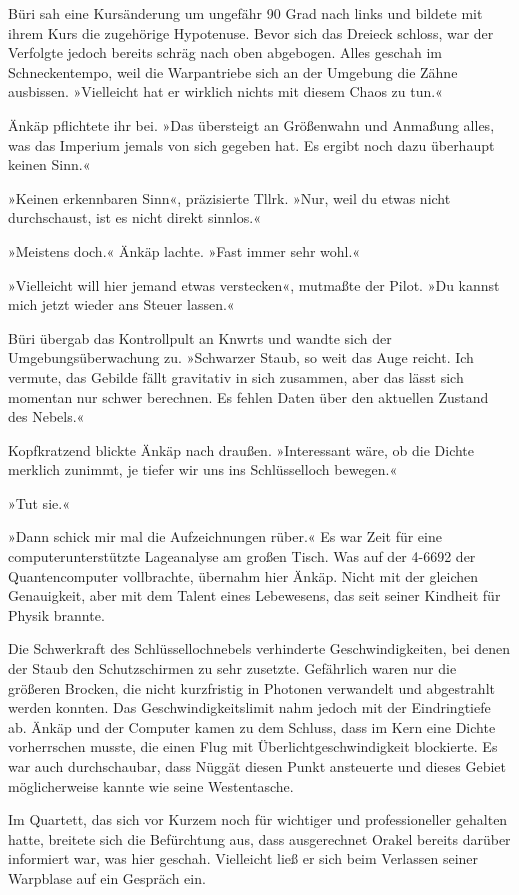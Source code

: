 Büri sah eine Kursänderung um ungefähr 90 Grad nach links und bildete mit ihrem Kurs die zugehörige Hypotenuse. Bevor sich das Dreieck schloss, war der Verfolgte jedoch bereits schräg nach oben abgebogen. Alles geschah im Schneckentempo, weil die Warpantriebe sich an der Umgebung die Zähne ausbissen. »Vielleicht hat er wirklich nichts mit diesem Chaos zu tun.«

Änkäp pflichtete ihr bei. »Das übersteigt an Größenwahn und Anmaßung alles, was das Imperium jemals von sich gegeben hat. Es ergibt noch dazu überhaupt keinen Sinn.«

»Keinen erkennbaren Sinn«, präzisierte Tllrk. »Nur, weil du etwas nicht durchschaust, ist es nicht direkt sinnlos.«

»Meistens doch.« Änkäp lachte. »Fast immer sehr wohl.«

»Vielleicht will hier jemand etwas verstecken«, mutmaßte der Pilot. »Du kannst mich jetzt wieder ans Steuer lassen.«

Büri übergab das Kontrollpult an Knwrts und wandte sich der Umgebungsüberwachung zu. »Schwarzer Staub, so weit das Auge reicht. Ich vermute, das Gebilde fällt gravitativ in sich zusammen, aber das lässt sich momentan nur schwer berechnen. Es fehlen Daten über den aktuellen Zustand des Nebels.«

Kopfkratzend blickte Änkäp nach draußen. »Interessant wäre, ob die Dichte merklich zunimmt, je tiefer wir uns ins Schlüsselloch bewegen.«

»Tut sie.«

»Dann schick mir mal die Aufzeichnungen rüber.« Es war Zeit für eine computerunterstützte Lageanalyse am großen Tisch. Was auf der 4-6692 der Quantencomputer vollbrachte, übernahm hier Änkäp. Nicht mit der gleichen Genauigkeit, aber mit dem Talent eines Lebewesens, das seit seiner Kindheit für Physik brannte.

Die Schwerkraft des Schlüssellochnebels verhinderte Geschwindigkeiten, bei denen der Staub den Schutzschirmen zu sehr zusetzte. Gefährlich waren nur die größeren Brocken, die nicht kurzfristig in Photonen verwandelt und abgestrahlt werden konnten. Das Geschwindigkeitslimit nahm jedoch mit der Eindringtiefe ab. Änkäp und der Computer kamen zu dem Schluss, dass im Kern eine Dichte vorherrschen musste, die einen Flug mit Überlichtgeschwindigkeit blockierte. Es war auch durchschaubar, dass Nüggät diesen Punkt ansteuerte und dieses Gebiet möglicherweise kannte wie seine Westentasche.

Im Quartett, das sich vor Kurzem noch für wichtiger und professioneller gehalten hatte, breitete sich die Befürchtung aus, dass ausgerechnet Orakel bereits darüber informiert war, was hier geschah. Vielleicht ließ er sich beim Verlassen seiner Warpblase auf ein Gespräch ein.

